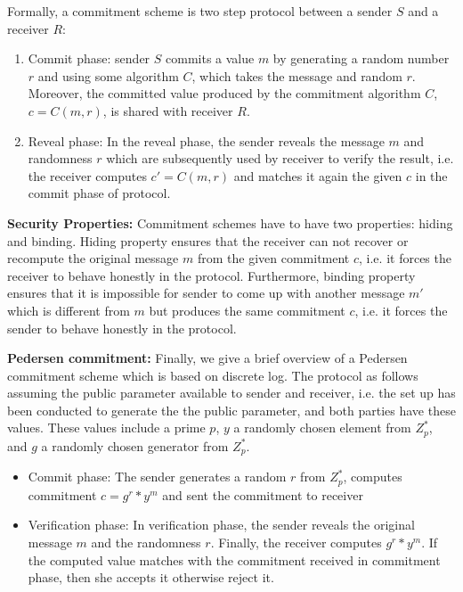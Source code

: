 \begin{enumerate}
{      
      Formally, a commitment scheme is two step protocol between a sender $S$ and a receiver $R$:
      \begin{enumerate}
      \item Commit phase: sender $S$ commits a value $m$ by generating a random number $r$ and using some algorithm $C$, which takes the message 
      and random $r$. Moreover, the committed value produced by the commitment algorithm $C$, $c = C(m, r)$, is shared with receiver $R$.
      \item Reveal phase: In the reveal phase, the sender reveals the message $m$ and randomness $r$ which are subsequently used by 
         receiver to verify the result, i.e. the receiver computes  $c' = C(m, r)$ and matches it again the given $c$ in the commit phase of protocol. 
      \end{enumerate}
      
      
    \textbf{Security Properties:} 
     Commitment schemes have to have two properties: hiding and binding. Hiding property ensures that 
     the receiver can not recover or recompute the original message $m$ from the given commitment $c$, i.e. 
     it forces the receiver to behave honestly in the protocol. 
     Furthermore, binding property ensures that it is impossible for sender to come up with 
     another message $m'$ which is different from $m$ but produces the same commitment $c$, i.e. 
     it forces the sender to behave honestly in the protocol. 
     
    \textbf{Pedersen commitment:}
     Finally, we give a brief overview of a Pedersen commitment scheme which is based on discrete log.  The protocol as follows assuming 
     the public parameter available to sender and receiver, i.e. the set up has been conducted to generate the the public parameter, 
     and both parties have these values. These values include a prime $p$, $y$ a randomly chosen element from $Z_{p}^{*}$, and $g$ 
     a randomly chosen generator from   $Z_{p}^{*}$.  
     
     \begin{itemize}
     \item Commit phase: The sender generates a random $r$ from $Z_{p}^{*}$, computes commitment $c = g^{r}*y^{m}$ and sent the commitment to 
        receiver
      \item Verification phase: In verification phase, the sender reveals the original message $m$ and the randomness $r$. Finally, 
            the receiver computes  $g^{r}*y^{m}$. If the computed  value matches with the commitment received in 
            commitment phase, then she accepts it otherwise reject it. 
     

\end{itemize}}
\end{enumerate}
